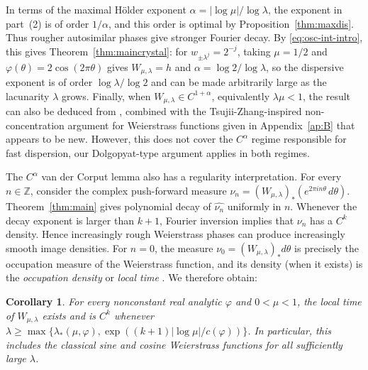 \documentclass[11pt]{amsart}
\theoremstyle{plain}
\newtheorem{corollary}[theorem]{Corollary}
\theoremstyle{definition}
\numberwithin{equation}{section}
\begin{document}
In terms of the maximal H\"older exponent $\alpha=|\log\mu|/\log\lambda$, the exponent in part~(2) is of order $1/\alpha$, and this order is optimal by Proposition~\ref{thm:maxdis}. Thus rougher autosimilar phases give stronger Fourier decay. By \eqref{eq:osc-int-intro}, this gives Theorem~\ref{thm:maincrystal}: for $w_{\pm\lambda^j}=2^{-j}$, taking $\mu=1/2$ and $\varphi(\theta)=2\cos(2\pi\theta)$ gives $W_{\mu,\lambda}=h$ and $\alpha=\log2/\log\lambda$, so the dispersive exponent is of order $\log\lambda/\log2$ and can be made arbitrarily large as the lacunarity $\lambda$ grows. Finally, when $W_{\mu,\lambda}\in C^{1+\alpha}$, equivalently $\lambda\mu<1$, the result can also be deduced from \cite{ACWW}, combined with the Tsujii-Zhang-inspired non-concentration argument for Weierstrass functions \cite{TZ23,Leclerc2} given in Appendix~\ref{ap:B} that appears to be new. However, this does not cover the $C^\alpha$ regime responsible for fast dispersion, our Dolgopyat-type argument applies in both regimes.

The $C^\alpha$ van der Corput lemma also has a regularity interpretation. For every $n\in\mathbb Z$, consider the complex push-forward measure $\nu_n=(W_{\mu,\lambda})_*(e^{2\pi in\theta}\,d\theta)$. Theorem~\ref{thm:main} gives polynomial decay of $\widehat{\nu_n}$ uniformly in $n$. Whenever the decay exponent is larger than $k+1$, Fourier inversion implies that $\nu_n$ has a $C^k$ density. Hence increasingly rough Weierstrass phases can produce increasingly smooth image densities. For $n=0$, the measure $\nu_0=(W_{\mu,\lambda})_*d\theta$ is precisely the occupation measure of the Weierstrass function, and its density (when it exists) is the \emph{occupation density} or \emph{local time} \cite{GemanHorowitz}. We therefore obtain:

\begin{corollary}\label{cor:localtime}
For every nonconstant real analytic $\varphi$ and $0<\mu<1$, the local time of $W_{\mu,\lambda}$ exists and is $C^k$ whenever $\lambda\geq\max\{\lambda_*(\mu,\varphi),\exp((k+1)|\log\mu|/c(\varphi))\}$. In particular, this includes the classical sine and cosine Weierstrass functions for all sufficiently large $\lambda$.
\end{corollary}
\end{document}
